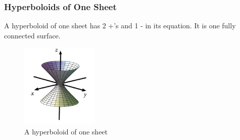 \subsubsection{Hyperboloids of One Sheet}
\noindent
A hyperboloid of one sheet has 2 +'s and 1 - in its equation. It is one fully connected surface.

\begin{figure}[H]
	\centering
	\includegraphics[width=0.33\textwidth]{./differentialMultivariableCalculus/one_sheet.png}
	\caption{A hyperboloid of one sheet}
\end{figure}